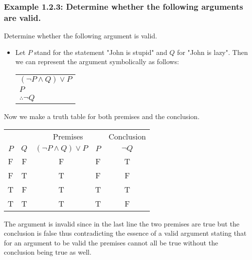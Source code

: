 \documentclass{article} %
\begin{document}
    \subsubsection*{Example 1.2.3: Determine whether the following arguments are valid.}

    Determine whether the following argument is valid.

    \begin{itemize}
        \item Let $P$ stand for the statement "John is stupid" and $Q$ for "John is lazy". Then we can represent the argument symbolically as follows:
        \begin{center}
        \begin{tabular}{ l }
            $(\neg P \wedge Q) \vee P$ \\
            $P$ \\ \hline
            $\therefore \neg Q$
        \end{tabular}
        \end{center}
    \end{itemize}

    Now we make a truth table for both premises and the conclusion.

    \begin{center}
    \begin{tabular}{ c c c c c }
            &     & \multicolumn{2}{c}{Premises}     & \multicolumn{1}{c}{Conclusion} \\
        $P$ & $Q$ & $(\neg P \wedge Q) \vee P$ & $P$ & $\neg Q$                       \\ \hline
        F   & F   & F                          & F   & T                              \\
        F   & T   & T                          & F   & F                              \\
        T   & F   & T                          & T   & T                              \\
        T   & T   & T                          & T   & F                             
    \end{tabular}
    \end{center}

    The argument is invalid since in the last line the two premises are true but the conclusion is false thus contradicting the essence of a valid argument stating that for an argument to be valid the premises cannot all be true without the conclusion being true as well.
\end{document}

